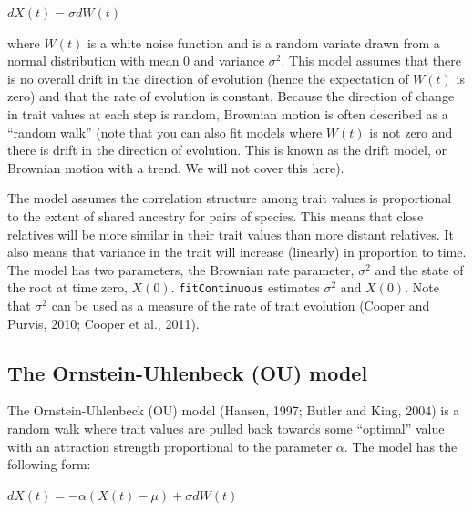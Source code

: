 \documentclass[]{book}
\theoremstyle{definition}
\theoremstyle{definition}
\theoremstyle{definition}
\theoremstyle{remark}
\begin{document}
\(dX(t) = \sigma dW(t)\)

where \(W(t)\) is a white noise function and is a random variate drawn
from a normal distribution with mean 0 and variance \(\sigma^2\). This
model assumes that there is no overall drift in the direction of
evolution (hence the expectation of \(W(t)\) is zero) and that the rate
of evolution is constant. Because the direction of change in trait
values at each step is random, Brownian motion is often described as a
``random walk'' (note that you can also fit models where \(W(t)\) is not
zero and there is drift in the direction of evolution. This is known as
the drift model, or Brownian motion with a trend. We will not cover this
here).

The model assumes the correlation structure among trait values is
proportional to the extent of shared ancestry for pairs of species. This
means that close relatives will be more similar in their trait values
than more distant relatives. It also means that variance in the trait
will increase (linearly) in proportion to time. The model has two
parameters, the Brownian rate parameter, \(\sigma^2\) and the state of
the root at time zero, \(X(0)\). \texttt{fitContinuous} estimates
\(\sigma^2\) and \(X(0)\). Note that \(\sigma^2\) can be used as a
measure of the rate of trait evolution (Cooper and Purvis, 2010; Cooper
et al., 2011).

\subsection{The Ornstein-Uhlenbeck (OU)
model}\label{the-ornstein-uhlenbeck-ou-model}

The Ornstein-Uhlenbeck (OU) model (Hansen, 1997; Butler and King, 2004)
is a random walk where trait values are pulled back towards some
``optimal'' value with an attraction strength proportional to the
parameter \(\alpha\). The model has the following form:

\(dX(t) = -\alpha(X(t) - \mu) + \sigma dW(t)\)
\end{document}
